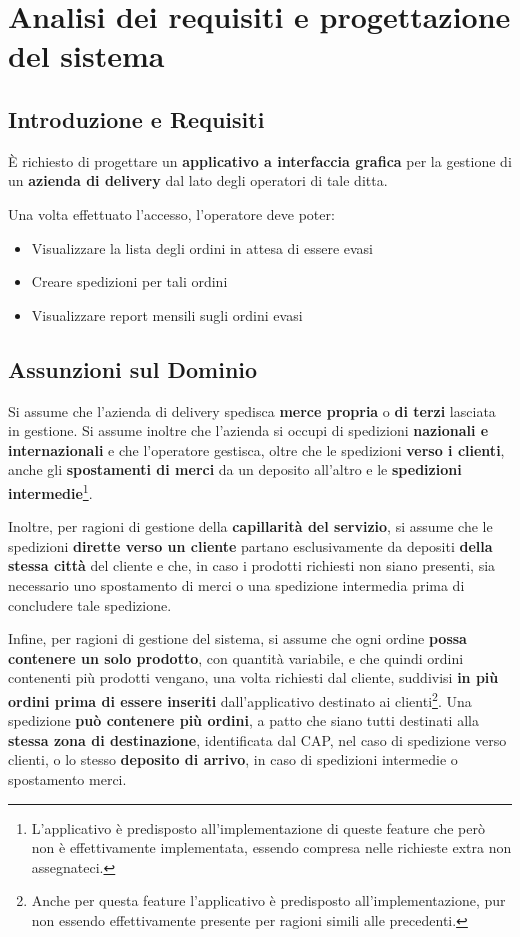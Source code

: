 \chapter{Analisi dei requisiti e progettazione del sistema}

\section{Introduzione e Requisiti}

È richiesto di progettare un \textbf{applicativo a interfaccia grafica} per la gestione di un \textbf{azienda 
di delivery} dal lato degli operatori di tale ditta.


Una volta effettuato l'accesso, l'operatore deve poter:

\begin{itemize}
  \item Visualizzare la lista degli ordini in attesa di essere evasi
  \item Creare spedizioni per tali ordini
  \item Visualizzare report mensili sugli ordini evasi
\end{itemize}

\section{Assunzioni sul Dominio}

Si assume che l'azienda di delivery spedisca \textbf{merce propria} o \textbf{di terzi} lasciata in 
gestione. Si assume inoltre che l'azienda si occupi di spedizioni \textbf{nazionali e 
internazionali} e che l'operatore gestisca, oltre che le spedizioni \textbf{verso i clienti},
anche gli \textbf{spostamenti di merci} da un deposito all'altro e le \textbf{spedizioni 
intermedie}\footnote{L'applicativo è predisposto all'implementazione di queste 
feature che però non è effettivamente implementata, essendo compresa nelle 
richieste extra non assegnateci.}.

Inoltre, per ragioni di gestione della \textbf{capillarità del servizio}, si assume che le
spedizioni \textbf{dirette verso un cliente} partano esclusivamente da depositi \textbf{della stessa
città} del cliente e che, in caso i prodotti richiesti non siano presenti, sia necessario
uno spostamento di merci o una spedizione intermedia prima di concludere tale spedizione.

Infine, per ragioni di gestione del sistema, si assume che ogni ordine \textbf{possa contenere
un solo prodotto}, con quantità variabile, e che quindi ordini contenenti più prodotti
vengano, una volta richiesti dal cliente, suddivisi \textbf{in più ordini prima di essere inseriti}
dall'applicativo destinato ai clienti\footnote{Anche per questa feature l'applicativo è 
predisposto all'implementazione, pur non essendo effettivamente presente per ragioni simili 
alle precedenti.}. Una spedizione \textbf{può contenere più ordini}, a patto che siano tutti destinati
alla \textbf{stessa zona di destinazione}, identificata dal CAP, nel caso di spedizione verso clienti,
o lo stesso \textbf{deposito di arrivo}, in caso di spedizioni intermedie o spostamento merci.



